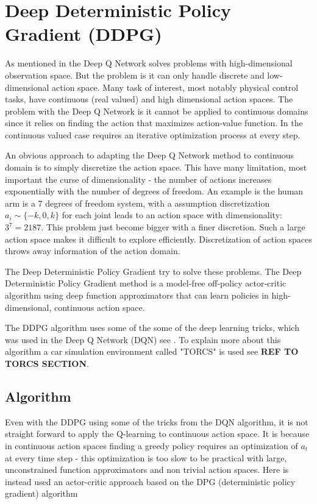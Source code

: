 \section{Deep Deterministic Policy Gradient (DDPG)}\label{DDPG}
As mentioned in  the Deep Q Network solves problems with high-dimensional observation space. But the problem is it can only handle discrete and low-dimensional action space. Many task of interest, most notably physical control tasks, have continuous (real valued) and high dimensional action spaces. The problem with the Deep Q Network is it cannot be applied to continuous domains since it relies on finding the action that maximizes action-value function. In the continuous valued case requires an iterative optimization process at every step. \cite{DBLP:journals/corr/LillicrapHPHETS15}

An obvious approach to adapting the Deep Q Network method to continuous domain is to simply discretize the action space. This have many limitation, most important the curse of dimensionality - the number of actions increases exponentially with the number of degrees of freedom. An example is the human arm is a 7 degrees of freedom system, with a assumption discretization $a_i \sim  \{-k,0,k\}$ for each joint leads to an action space with dimensionality: $3^7 = 2187$. This problem just become bigger with a finer discretion. Such a large action space makes it difficult to explore efficiently. Discretization of action spaces throws away information of the action domain.

The Deep Deterministic Policy Gradient try to solve these problems. The Deep Deterministic Policy Gradient method is a model-free off-policy actor-critic algorithm using deep function approximators that can learn policies in high-dimensional, continuous action space. 

The DDPG algorithm uses some of the some of the deep learning tricks, which was used in the Deep Q Network (DQN) see . To explain more about this algorithm a car simulation environment called "TORCS" is used see \textbf{REF TO TORCS SECTION}. \cite{DDPG_Torcs} 

\subsection{Algorithm}
Even with the DDPG using some of the tricks from the DQN algorithm, it is not straight forward to apply the Q-learning to continuous action space. It is because in continuous action spaces finding a greedy policy requires an optimization of \textit{$a_t$} at every time step - this optimization is too slow to be practical with large, unconstrained function approximators and non trivial action spaces. Here is instead used an actor-critic approach based on the DPG (deterministic policy gradient) algorithm \cite{DBLP:conf/icml/SilverLHDWR14}

